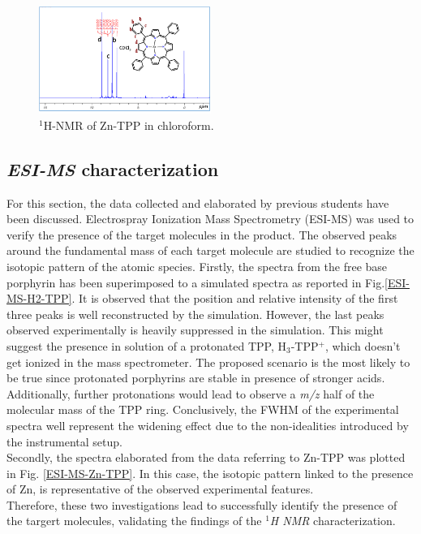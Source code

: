 \documentclass[twoside,twocolumn,9pt]{article}
\begin{document}
\begin{figure}
	\centering
	\includegraphics[width=0.5\textwidth]{1H-NMR-Zn-TPP}
	\caption{$^{1}$H-NMR of Zn-TPP in chloroform.}
	\label{NMR}
\end{figure}
\subsection{\textit{ESI-MS} characterization}
For this section, the data collected and elaborated by previous students have been discussed.
Electrospray Ionization Mass Spectrometry (ESI-MS) was used to verify the presence of the target molecules in the product.
The observed peaks around the fundamental mass of each target molecule are studied to recognize the isotopic pattern of the atomic species.
Firstly, the spectra from the free base porphyrin has been superimposed to a simulated spectra as reported in Fig.\ref{ESI-MS-H2-TPP}.
It is observed that the position and relative intensity of the first three peaks is well reconstructed by the simulation.
However, the last peaks observed experimentally is heavily suppressed in the simulation.
This might suggest the presence in solution of a protonated TPP, H$_{3}$-TPP$^{+}$, which doesn't get ionized in the mass spectrometer.
The proposed scenario is the most likely to be true since protonated porphyrins are stable in presence of stronger acids.
Additionally, further protonations would lead to observe a \textit{m/z} half of the molecular mass of the TPP ring.
Conclusively, the FWHM of the experimental spectra well represent the widening effect due to the non-idealities introduced by the instrumental setup.\\

Secondly, the spectra elaborated from the data referring to Zn-TPP was plotted in Fig. \ref{ESI-MS-Zn-TPP}.
In this case, the isotopic pattern linked to the presence of Zn, is representative of the observed experimental features.\\
Therefore, these two investigations lead to successfully identify the presence of the targert molecules, validating the findings of the \textit{$^{1}$H NMR} characterization.\\
\end{document}
